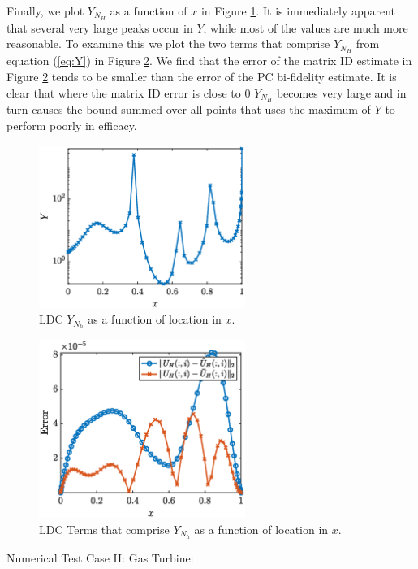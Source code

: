 \documentclass{report}
\begin{document}
Finally, we plot $Y_{N_H}$ as a function of $x$ in Figure \ref{fig:LDC_Y}. It is immediately apparent that several very large peaks occur in $Y$, while most of the values are much more reasonable. To examine this we plot the two terms that comprise $Y_{N_H}$ from equation (\ref{eq:Y}) in Figure \ref{fig:LDC_Y_ratio}. We find that the error of the matrix ID estimate in Figure \ref{fig:LDC_Y_ratio} tends to be smaller than the error of the PC bi-fidelity estimate. It is clear that where the matrix ID error is close to $0$ $Y_{N_H}$ becomes very large and in turn causes the bound summed over all points that uses the maximum of $Y$ to perform poorly in efficacy.  \\
% 
\begin{figure}[ht!]
\centering
\includegraphics[width =0.6\textwidth]{Figures/LDC_Y.eps}
\caption{LDC $Y_{N_h}$ as a function of location in $x$.} 
\label{fig:LDC_Y}
\end{figure}
%
% 
\begin{figure}[ht!]
\centering
\includegraphics[width =0.6\textwidth]{Figures/LDC_Y_ratio.eps}
\caption{LDC Terms that comprise $Y_{N_h}$ as a function of location in $x$.} 
\label{fig:LDC_Y_ratio}
\end{figure}
%


Numerical Test Case II: Gas Turbine: \\
\end{document}
